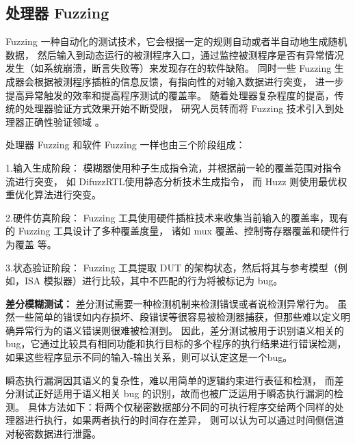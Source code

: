 \subsection{处理器 Fuzzing}

Fuzzing 一种自动化的测试技术，它会根据一定的规则自动或者半自动地生成随机数据，
然后输入到动态运行的被测程序入口，通过监控被测程序是否有异常情况发生（如系统崩溃，断言失败等）来发现存在的软件缺陷。
同时一些 Fuzzing 生成器会根据被测程序插桩的信息反馈，有指向性的对输入数据进行突变，
进一步提高异常触发的效率和提高程序测试的覆盖率。
随着处理器复杂程度的提高，传统的处理器验证方式效果开始不断受限，
研究人员转而将 Fuzzing 技术引入到处理器正确性验证领域 
\cite{bruns2022efficient}\cite{canakci2021directfuzz}\cite{hur2021difuzzrtl}。\par

处理器 Fuzzing 和软件 Fuzzing 一样也由三个阶段组成：\par

1.输入生成阶段：
模糊器使用种子生成指令流，并根据前一轮的覆盖范围对指令流进行突变，
如 DifuzzRTL\cite{hur2021difuzzrtl}使用静态分析技术生成指令，
而 Huzz\cite{kande2022thehuzz} 则使用最优权重优化算法进行突变。\par

2.硬件仿真阶段：
Fuzzing 工具使用硬件插桩技术来收集当前输入的覆盖率，现有的 Fuzzing 工具设计了多种覆盖度量，
诸如 mux 覆盖\cite{laeufer2018rfuzz}、控制寄存器覆盖\cite{hur2021difuzzrtl}和硬件行为覆盖\cite{kande2022thehuzz} 等。\par

3.状态验证阶段：
Fuzzing 工具提取 DUT 的架构状态，然后将其与参考模型（例如，ISA 模拟器）进行比较，其中不匹配的行为将被标记为 bug。\par

\par

\textbf{差分模糊测试：}
差分测试需要一种检测机制来检测错误或者说检测异常行为。
虽然一些简单的错误如内存损坏、段错误等很容易被检测器捕获，但那些难以定义明确异常行为的语义错误则很难被检测到。
因此，差分测试被用于识别语义相关的 bug，它通过比较具有相同功能和执行目标的多个程序的执行结果进行错误检测，
如果这些程序显示不同的输入-输出关系，则可以认定这是一个bug。\par

瞬态执行漏洞因其语义的复杂性，难以用简单的逻辑约束进行表征和检测，
而差分测试正好适用于语义相关 bug 的识别，故而也被广泛运用于瞬态执行漏洞的检测。
具体方法如下：将两个仅秘密数据部分不同的可执行程序交给两个同样的处理器进行执行，如果两者执行的时间存在差异，
则可以认为可以通过时间侧信道对秘密数据进行泄露。

